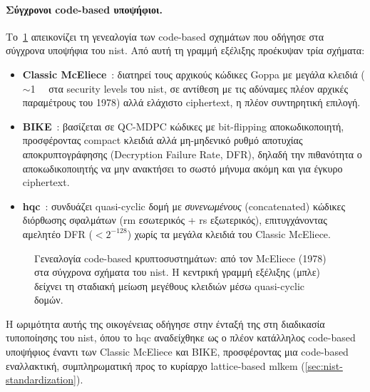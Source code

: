 \paragraph{Σύγχρονοι code-based υποψήφιοι.}
Το~\cref{fig:code-based-genealogy} απεικονίζει τη γενεαλογία των code-based σχημάτων
που οδήγησε στα σύγχρονα υποψήφια του \gls{nist}.
Από αυτή τη γραμμή εξέλιξης προέκυψαν τρία σχήματα:
\begin{itemize}
  \item \textbf{Classic McEliece}~\cite{ClassicMcEliece2020}: διατηρεί τους αρχικούς
    κώδικες Goppa με μεγάλα κλειδιά ($\sim$\SI{1}{\mega\byte} στα security levels του \gls{nist}, σε αντίθεση με τις αδύναμες πλέον αρχικές παραμέτρους του 1978) αλλά ελάχιστο
    ciphertext, η πλέον συντηρητική επιλογή.
  \item \textbf{BIKE}~\cite{BIKE-spec2024}: βασίζεται σε QC-MDPC κώδικες με bit-flipping αποκωδικοποιητή,
    προσφέροντας compact κλειδιά αλλά μη-μηδενικό ρυθμό αποτυχίας αποκρυπτογράφησης
    (Decryption Failure Rate, DFR), δηλαδή την πιθανότητα ο αποκωδικοποιητής να μην ανακτήσει το σωστό μήνυμα ακόμη και για έγκυρο ciphertext.
  \item \textbf{\gls{hqc}}~\cite{HQC-spec2024}: συνδυάζει quasi-cyclic δομή με \emph{συνενωμένους} (concatenated) κώδικες
    διόρθωσης σφαλμάτων (\gls{rm} εσωτερικός + \gls{rs} εξωτερικός), επιτυγχάνοντας
    αμελητέο DFR ($< 2^{-128}$) χωρίς τα μεγάλα κλειδιά του Classic McEliece.
\end{itemize}

\begin{figure}[htbp]
  \centering
  
  \caption[Γενεαλογία code-based κρυπτοσυστημάτων]{Γενεαλογία code-based κρυπτοσυστημάτων: από τον McEliece (1978) στα
  σύγχρονα σχήματα του \gls{nist}. Η κεντρική γραμμή εξέλιξης (μπλε) δείχνει
  τη σταδιακή μείωση μεγέθους κλειδιών μέσω quasi-cyclic δομών.}
  \label{fig:code-based-genealogy}
\end{figure}

Η ωριμότητα αυτής της οικογένειας οδήγησε στην ένταξή της στη διαδικασία τυποποίησης του \gls{nist}, όπου το \gls{hqc} αναδείχθηκε ως ο πλέον κατάλληλος code-based υποψήφιος έναντι των Classic McEliece και BIKE, προσφέροντας μια code-based εναλλακτική, συμπληρωματική προς το κυρίαρχο lattice-based \gls{mlkem} (\cref{sec:nist-standardization}).


